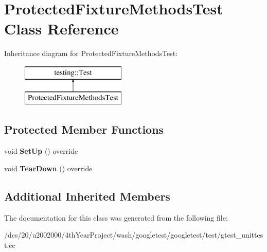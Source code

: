\hypertarget{classProtectedFixtureMethodsTest}{}\section{Protected\+Fixture\+Methods\+Test Class Reference}
\label{classProtectedFixtureMethodsTest}
Inheritance diagram for Protected\+Fixture\+Methods\+Test\+:\begin{figure}[H]
\begin{center}
\leavevmode
\includegraphics[height=2.000000cm]{classProtectedFixtureMethodsTest}
\end{center}
\end{figure}
\subsection*{Protected Member Functions}
\begin{DoxyCompactItemize}
\item 
\mbox{\label{classProtectedFixtureMethodsTest_a9d68d51c945c3f810cc2ab76e71ecb95}} 
void {\bfseries Set\+Up} () override
\item 
\mbox{\label{classProtectedFixtureMethodsTest_a826369510d499ffcab66649f7315e8cd}} 
void {\bfseries Tear\+Down} () override
\end{DoxyCompactItemize}
\subsection*{Additional Inherited Members}


The documentation for this class was generated from the following file\+:\begin{DoxyCompactItemize}
\item 
/dcs/20/u2002000/4th\+Year\+Project/wash/googletest/googletest/test/gtest\+\_\+unittest.\+cc\end{DoxyCompactItemize}
